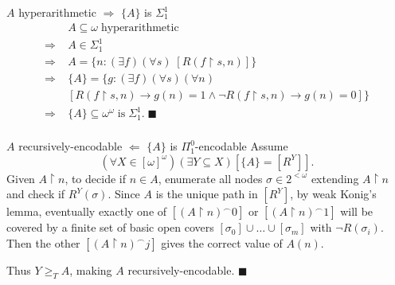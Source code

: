 \begin{frame}{$A$ hyperarithmetic $\Rightarrow$ $\{A\}$ is $\Sigma_1^1$}
  \begin{align*}
    \;&A\subseteq\omega\; \text{hyperarithmetic}\\
    \Rightarrow\; & A\in\Sigma_1^1\\
    \Rightarrow\; & A=\{n:(\exists f)(\forall s)\; [R(f\restriction s,n)]\}\\
    \Rightarrow\; & \{A\}= \{g:(\exists f)(\forall s)(\forall n)\\
    &[R(f\restriction s,n) \rightarrow g(n)=1 \wedge \neg R(f\restriction s,n)
      \rightarrow g(n)=0]\}\\
    \Rightarrow\; &\{A\}\subseteq\omega^\omega\; \text{is}\; \Sigma_1^1.\;
    \blacksquare\\
  \end{align*}
\end{frame}

\begin{frame}{$A$ recursively-encodable $\Leftarrow$
$\{A\}$ is $\Pi_1^0$-encodable}
  Assume
  \[(\forall X\in[\omega]^\omega)(\exists Y\subseteq X) [\{A\}=[R^Y]].\]
  Given $A\restriction n$, to decide if $n\in A$, enumerate all nodes
  $\sigma\in2^{<\omega}$ extending $A\restriction n$ and check if
  $R^Y(\sigma)$. Since $A$ is the unique path in $[R^Y]$, by weak Konig's
  lemma, eventually exactly one of $[(A\restriction n)^\frown 0]$ or
  $[(A\restriction n)^\frown 1]$ will be covered by a finite set of basic
  open covers $[\sigma_0]\cup\ldots\cup[\sigma_m]$ with $\neg R(\sigma_i)$.
  Then the other $[(A\restriction n)^\frown j]$ gives the correct value
  of $A(n)$.
  \vspace{0.5em}

  Thus $Y\geq_TA$, making $A$ recursively-encodable. $\blacksquare$
\end{frame}

